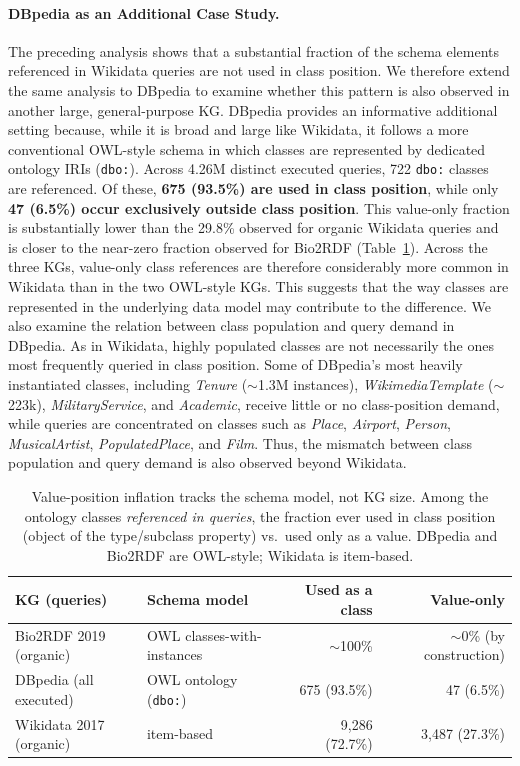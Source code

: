 \documentclass[sw]{iosart2x}
\begin{document}
\paragraph{\textbf{DBpedia as an Additional Case Study.}} The preceding analysis shows that a substantial fraction of the schema elements referenced in Wikidata queries are not used in class position. We therefore extend the same analysis to DBpedia to examine whether this pattern is also observed in another large, general-purpose KG. DBpedia provides an informative additional setting because, while it is broad and large like Wikidata, it follows a more conventional OWL-style schema in which classes are represented by dedicated ontology IRIs (\texttt{dbo:}). Across 4.26M distinct executed queries, 722 \texttt{dbo:} classes are referenced. Of these, \textbf{675 (93.5\%) are used in class position}, while only \textbf{47 (6.5\%) occur exclusively outside class position}. This value-only fraction is substantially lower than the 29.8\% observed for organic Wikidata queries and is closer to the near-zero fraction observed for Bio2RDF (Table~\ref{tab:generality}). Across the three KGs, value-only class references are therefore considerably more common in Wikidata than in the two OWL-style KGs. This suggests that the way classes are represented in the underlying data model may contribute to the difference. We also examine the relation between class population and query demand in DBpedia. As in Wikidata, highly populated classes are not necessarily the ones most frequently queried in class position. Some of DBpedia's most heavily instantiated classes, including \emph{Tenure} ($\sim$1.3M instances), \emph{WikimediaTemplate} ($\sim$223k), \emph{MilitaryService}, and \emph{Academic}, receive little or no class-position demand, while queries are concentrated on classes such as \emph{Place}, \emph{Airport}, \emph{Person}, \emph{MusicalArtist}, \emph{PopulatedPlace}, and \emph{Film}. Thus, the mismatch between class population and query demand is also observed beyond Wikidata.

\begin{table}[ht]
\centering
\caption{Value-position inflation tracks the schema model, not KG size. Among the ontology classes \emph{referenced in queries}, the fraction ever used in class position (object of the type/subclass property) vs.\ used only as a value. DBpedia and Bio2RDF are OWL-style; Wikidata is item-based.}
\label{tab:generality}
\begin{tabular}{l|l|r|r}
\hline
KG (queries) & Schema model & Used as a class & Value-only \\
\hline
Bio2RDF 2019 (organic) & OWL classes-with-instances & $\sim$100\% & $\sim$0\% (by construction) \\
DBpedia (all executed) & OWL ontology (\texttt{dbo:}) & 675 (93.5\%) & 47 (6.5\%) \\
Wikidata 2017 (organic) & item-based & 9,286 (72.7\%) & 3,487 (27.3\%) \\
\hline
\end{tabular}
\end{table}
\end{document}
